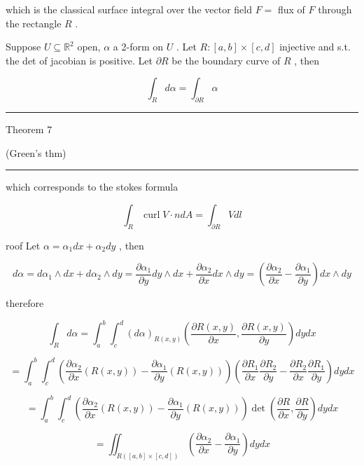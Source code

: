 \documentclass[lang=cn,a4paper,11pt,openany,twoside]{elegantbook}
\newcommand{\HRule}{\begin{center}\rule{0.9\linewidth}{0.2mm}\end{center}}
\begin{document}
which is the classical surface integral over the vector field \(F =\) flux of \(F\) through the rectangle \(R\) .

Suppose \(U \subseteq  {\mathbb{R}}^{2}\) open, \(\alpha\) a 2-form on \(U\) . Let \(R : \left\lbrack  {a,b}\right\rbrack   \times  \left\lbrack  {c,d}\right\rbrack\) injective and s.t. the det of jacobian is positive. Let \(\partial R\) be the boundary curve of \(R\) , then

\[
{\int }_{R}{d\alpha } = {\int }_{\partial R}\alpha
\]

\HRule

Theorem 7

(Green's thm)

\HRule

which corresponds to the stokes formula

\[
{\int }_{R}\operatorname{curl}V \cdot  {ndA} = {\int }_{\partial R}{Vdl}
\]

roof Let \(\alpha  = {\alpha }_{1}{dx} + {\alpha }_{2}{dy}\) , then

\[
{d\alpha } = d{\alpha }_{1} \land  {dx} + d{\alpha }_{2} \land  {dy} = \frac{\partial {\alpha }_{1}}{\partial y}{dy} \land  {dx} + \frac{\partial {\alpha }_{2}}{\partial x}{dx} \land  {dy} = \left( {\frac{\partial {\alpha }_{2}}{\partial x} - \frac{\partial {\alpha }_{1}}{\partial y}}\right) {dx} \land  {dy}
\]

therefore

\[
{\int }_{R}{d\alpha } = {\int }_{a}^{b}{\int }_{c}^{d}{\left( d\alpha \right) }_{R\left( {x,y}\right) }\left( {\frac{\partial R\left( {x,y}\right) }{\partial x},\frac{\partial R\left( {x,y}\right) }{\partial y}}\right) {dydx}
\]

\[
= {\int }_{a}^{b}{\int }_{c}^{d}\left( {\frac{\partial {\alpha }_{2}}{\partial x}\left( {R\left( {x,y}\right) }\right)  - \frac{\partial {\alpha }_{1}}{\partial y}\left( {R\left( {x,y}\right) }\right) }\right) \left( {\frac{\partial {R}_{1}}{\partial x}\frac{\partial {R}_{2}}{\partial y} - \frac{\partial {R}_{2}}{\partial x}\frac{\partial {R}_{1}}{\partial y}}\right) {dydx}
\]

\[
= {\int }_{a}^{b}{\int }_{c}^{d}\left( {\frac{\partial {\alpha }_{2}}{\partial x}\left( {R\left( {x,y}\right) }\right)  - \frac{\partial {\alpha }_{1}}{\partial y}\left( {R\left( {x,y}\right) }\right) }\right) \det \left( {\frac{\partial R}{\partial x},\frac{\partial R}{\partial y}}\right) {dydx}
\]

\[
= {\iint }_{R\left( {\left\lbrack  {a,b}\right\rbrack   \times  \left\lbrack  {c,d}\right\rbrack  }\right) }\left( {\frac{\partial {\alpha }_{2}}{\partial x} - \frac{\partial {\alpha }_{1}}{\partial y}}\right) {dydx}
\]
\end{document}
